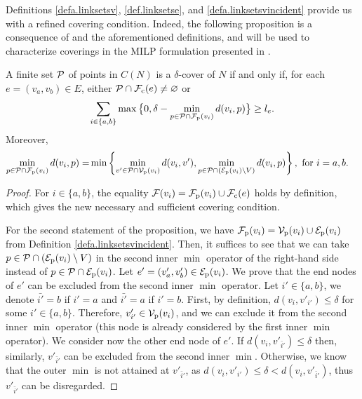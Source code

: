 Definitions  \ref{defa.linksetsv}, \ref{def.linksetse}, and \ref{defa.linksetsvincident}  provide us with a refined covering condition. Indeed, the following proposition is a consequence of  and the aforementioned definitions, and will be used to characterize coverings in the MILP formulation presented in .

\begin{proposition}
\label{cora.covercond}
A finite set $\mathcal P$ of points in $C(N)$  is a $\delta$-cover of $N$ if and only if,
for each $e=(v_a,v_b) \in E$, either $\mathcal P \cap \mathcal F_{\mathrm{c}}(e) \ne \varnothing$ or
\begin{equation}
\label{eqa.coverdistfull}
	\sum_{i \in \{a,b\}} \max \big\{0,\delta -  \min_{p \in   \mathcal P \cap \mathcal F_{\mathrm{p}}(v_i)} d( v_{i}, p)\big \} \ge l_e.
\end{equation}
Moreover,
\begin{equation}\nonumber
\begin{split}
\min_{p \in \mathcal P \cap \mathcal F_{\mathrm{p}}(v_i)}d(v_{i}, p)
   = &\min \left\{\min_{v' \in \mathcal P \cap \mathcal V_{\mathrm{p}}(v_i)} d(v_{i}, v'), \min_{p \in  \mathcal P \cap ({\mathcal E}_{\mathrm{p}}(v_i)\setminus  V)}  d(v_{i}, p) \right\}, \textup{ for } i=a,b.
\end{split}
\end{equation}
\end{proposition}
\begin{proof}
For $i \in \{a,b\}$, the equality $\mathcal F(v_i)=\mathcal F_{\mathrm{p}}(v_i)\cup\mathcal F_{\mathrm{c}}(e)$ holds by definition, which gives the new necessary and sufficient covering condition.

For the second statement of the proposition, we have $\mathcal F_{\mathrm{p}}(v_i)=\mathcal V_{\mathrm{p}}(v_i)\cup {\mathcal E}_{\mathrm{p}}(v_i)$ from Definition \ref{defa.linksetsvincident}. Then, it suffices to see that we can take $p \in  \mathcal P \cap ({\mathcal E}_{\mathrm{p}}(v_i)\setminus  V)$ in the second inner $\min$ operator of the right-hand side instead of $p \in  \mathcal P \cap {\mathcal E}_{\mathrm{p}}(v_i)$. Let $e'=(v'_a,v'_b)\in  {\mathcal E}_{\mathrm{p}}(v_i)$. We prove that the end nodes of $e'$ can be excluded from the second inner $\min$ operator.  Let $i' \in \{a,b\}$, we denote $\bar{i'}=b$ if $i'=a$ and $\bar{i'}=a$ if $i'=b$.  First, by definition, $d(v_i,v'_{i'})\leq \delta$ for some $i'\in\{a,b\}$. Therefore, $v'_{i'}\in \mathcal V_{\mathrm{p}}(v_i)$, and we can exclude it from the second inner $\min$ operator (this node is already considered by the first inner $\min$ operator). We consider now the other end node of $e'$. If $d(v_i,v'_{\bar i'})\leq \delta$ then, similarly, $v'_{\bar{i}'}$ can be excluded from the second inner $\min$. Otherwise, we know that the outer $\min$ is not attained at $v'_{\bar i'}$, as  $d(v_i,v'_{i'})\leq \delta < d(v_i,v'_{\bar i'})$, thus $v'_{\bar i'}$ can be disregarded.
\end{proof}

